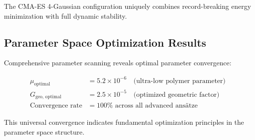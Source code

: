 \documentclass[11pt]{article}
\begin{document}
The CMA-ES 4-Gaussian configuration uniquely combines record-breaking energy minimization with full dynamic stability.

\subsection{Parameter Space Optimization Results}

Comprehensive parameter scanning reveals optimal parameter convergence:

\begin{align}
\mu_{\text{optimal}} &= 5.2 \times 10^{-6} \quad \text{(ultra-low polymer parameter)} \\
G_{\text{geo, optimal}} &= 2.5 \times 10^{-5} \quad \text{(optimized geometric factor)} \\
\text{Convergence rate} &= 100\% \text{ across all advanced ansätze}
\end{align}

This universal convergence indicates fundamental optimization principles in the parameter space structure.
\end{document}
